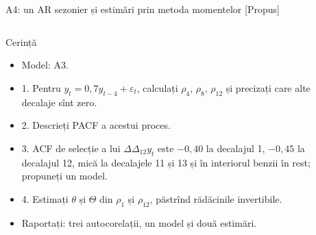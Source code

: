 \begin{frame}{A4: un AR sezonier și estimări prin metoda momentelor [Propus]}
\propsub
\itemsize{\scriptsize}
\begin{columns}[T]
\begin{column}{\taskw}
\begin{block}{Cerință}
\begin{itemize}
    \item Model: A3.
    \item 1. Pentru $y_t = 0{,}7y_{t-4} + \varepsilon_t$, calculați $\rho_4$, $\rho_8$, $\rho_{12}$ și precizați care alte decalaje sînt zero.
    \item 2. Descrieți PACF a acestui proces.
    \item 3. ACF de selecție a lui $\Delta\Delta_{12}y_t$ este $-0{,}40$ la decalajul 1, $-0{,}45$ la decalajul 12, mică la decalajele 11 și 13 și în interiorul benzii în rest; propuneți un model.
    \item 4. Estimați $\theta$ și $\Theta$ din $\rho_1$ și $\rho_{12}$, păstrînd rădăcinile invertibile.
    \item Raportați: trei autocorelații, un model și două estimări.
\end{itemize}
\end{block}
\end{column}
\begin{column}{\solw}
\end{column}
\end{columns}
\end{frame}

